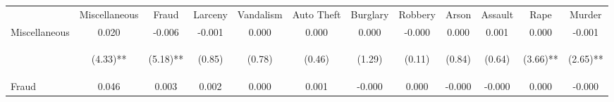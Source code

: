 \begin{tabular}{lccccccccccc}
\toprule \noalign{\smallskip} & Miscellaneous & Fraud & Larceny & Vandalism & Auto Theft & Burglary & Robbery & Arson & Assault & Rape & Murder\\
\noalign{\smallskip}\midrule \noalign{\smallskip}Miscellaneous & 0.020 & -0.006 & -0.001 & 0.000 & 0.000 & 0.000 & -0.000 & 0.000 & 0.001 & 0.000 & -0.001\\
 & \begin{footnotesize}(4.33)**\end{footnotesize} & \begin{footnotesize}(5.18)**\end{footnotesize} & \begin{footnotesize}(0.85)\end{footnotesize} & \begin{footnotesize}(0.78)\end{footnotesize} & \begin{footnotesize}(0.46)\end{footnotesize} & \begin{footnotesize}(1.29)\end{footnotesize} & \begin{footnotesize}(0.11)\end{footnotesize} & \begin{footnotesize}(0.84)\end{footnotesize} & \begin{footnotesize}(0.64)\end{footnotesize} & \begin{footnotesize}(3.66)**\end{footnotesize} & \begin{footnotesize}(2.65)**\end{footnotesize}\\
\noalign{\smallskip}Fraud & 0.046 & 0.003 & 0.002 & 0.000 & 0.001 & -0.000 & 0.000 & -0.000 & -0.000 & 0.000 & -0.000\\

\end{tabular}
